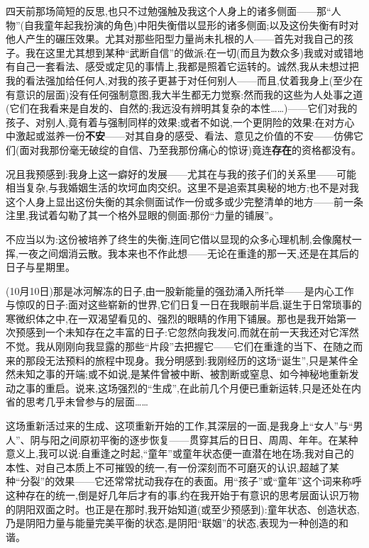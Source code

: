 四天前那场简短的反思,也只不过勉强触及我这个人身上的诸多侧面——那“人物”(自我童年起我扮演的角色)中阳失衡借以显形的诸多侧面;以及这份失衡有时对他人产生的碾压效果。尤其对那些阳型力量尚未扎根的人——首先对我自己的孩子。我在这里尤其想到某种“武断自信”的做派:在一切(而且为数众多)我或对或错地有自己一套看法、感受或定见的事情上,我都是照着它运转的。诚然,我从未想过把我的看法强加给任何人,对我的孩子更甚于对任何别人——而且,仗着我身上(至少在有意识的层面)没有任何强制意图,我大半生都无力觉察:然而我的这些为人处事之道(它们在我看来是自发的、自然的;我远没有辨明其复杂的本性……)——它们对我的孩子、对别人,竟有着与强制同样的效果;或者不如说,一个更阴险的效果:在对方心中激起或滋养一份\textbf{不安}——对其自身的感受、看法、意见之价值的不安——仿佛它们(面对我那份毫无破绽的自信、乃至我那份痛心的惊讶)竟连\textbf{存在}的资格都没有。

况且我预感到:我身上这一癖好的发展——尤其在与我的孩子们的关系里——可能相当复杂,与我婚姻生活的坎坷血肉交织。这里不是追索其奥秘的地方;也不是对我这个人身上显出这份失衡的其余侧面试作一份或多或少\dmark{}完整清单的地方——前一条注里,我试着勾勒了其一个格外显眼的侧面:那份“力量的铺展”。

不应当以为:这份被培养了终生的失衡,连同它借以显现的众多心理机制,会像魔杖一挥,一夜之间烟消云散。我本来也不作此想——无论在重逢的那一天,还是在其后的日子与星期里。

(10月10日)那是冰河解冻的日子,由一股新能量的强劲涌入所托举——是内心工作与惊叹的日子:面对这些崭新的世界,它们日复一日在我眼前半启,诞生于日常琐事的寒微织体之中,在一双渴望看见的、强烈的眼睛的作用下铺展。那也是我开始第一次预感到一个未知存在之丰富的日子:它忽然向我发问,而就在前一天我还对它浑然不觉。我从刚刚向我显露的那些“片段”去把握它——它们在重逢的当下、在随之而来的那段无法预料的旅程中现身。我分明感到:我刚经历的这场“诞生”,只是某件全然未知之事的开端;或不如说,是某件曾被中断、被割断或窒息、如今神秘地重新发动之事的重启。说来,这场强烈的“生成”,在此前几个月便已重新运转,只是还处在内省的思考几乎未曾参与的层面……

这场重新活过来的生成、这项重新开始的工作,其深层的一面,是我身上“女人”与“男人”、阴与阳之间原初平衡的逐步恢复——贯穿其后的日日、周周、年年。在某种意义上,我可以说:自重逢之时起,“童年”或童年状态便一直潜在地在场;我对自己的本性、对自己本质上不可摧毁的统一,有一份深刻而不可磨灭的认识,超越了某种“分裂”的效果——它还常常扰动我存在的表面。用“孩子”或“童年”这个词来称呼这种存在的统一,\dmark{}倒是好几年后才有的事,约在我开始于有意识的思考层面认识万物的阴阳双面之时。也正是在那时,我开始知道(或至少预感到):童年状态、创造状态,乃是阴阳力量与能量完美平衡的状态,是阴阳“联姻”的状态,表现为一种创造的和谐。

